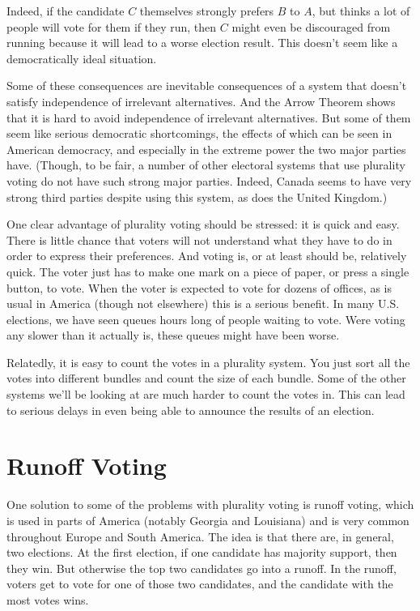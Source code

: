 Indeed, if the candidate $C$ themselves strongly prefers $B$ to $A$, but thinks a lot of people will vote for them if they run, then $C$ might even be discouraged from running because it will lead to a worse election result. This doesn't seem like a democratically ideal situation.

Some of these consequences are inevitable consequences of a system that doesn't satisfy independence of irrelevant alternatives. And the Arrow Theorem shows that it is hard to avoid independence of irrelevant alternatives. But some of them seem like serious democratic shortcomings, the effects of which can be seen in American democracy, and especially in the extreme power the two major parties have. (Though, to be fair, a number of other electoral systems that use plurality voting do not have such strong major parties. Indeed, Canada seems to have very strong third parties despite using this system, as does the United Kingdom.)

One clear advantage of plurality voting should be stressed: it is quick and easy. There is little chance that voters will not understand what they have to do in order to express their preferences. And voting is, or at least should be, relatively quick. The voter just has to make one mark on a piece of paper, or press a single button, to vote. When the voter is expected to vote for dozens of offices, as is usual in America (though not elsewhere) this is a serious benefit. In many U.S. elections, we have seen queues hours long of people waiting to vote. Were voting any slower than it actually is, these queues might have been worse.

Relatedly, it is easy to count the votes in a plurality system. You just sort all the votes into different bundles and count the size of each bundle. Some of the other systems we'll be looking at are much harder to count the votes in. This can lead to serious delays in even being able to announce the results of an election.

\section{Runoff Voting}
One solution to some of the problems with plurality voting is runoff voting, which is used in parts of America (notably Georgia and Louisiana) and is very common throughout Europe and South America. The idea is that there are, in general, two elections. At the first election, if one candidate has majority support, then they win. But otherwise the top two candidates go into a runoff. In the runoff, voters get to vote for one of those two candidates, and the candidate with the most votes wins.

